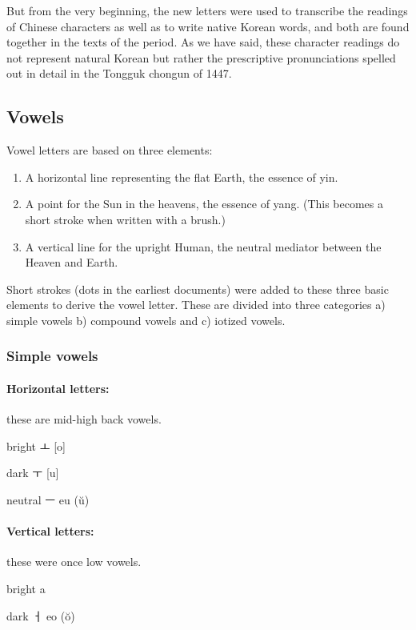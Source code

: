 But from the very beginning, the new letters were used to transcribe
the readings of Chinese characters as well as to write native Korean words,
and both are found together in the texts of the period. As we have said,
these character readings do not represent natural Korean but rather the
prescriptive pronunciations spelled out in detail in the Tongguk chongun
of 1447.

\subsection{Vowels}

Vowel letters are based on three elements:

\begin{enumerate}
\item A horizontal line representing the flat Earth, the essence of yin.

\item A point for the Sun in the heavens, the essence of yang. (This becomes a short stroke when written with a brush.)

\item A vertical line for the upright Human, the neutral mediator between the Heaven and Earth.
\end{enumerate}

Short strokes (dots in the earliest documents) were added to these three basic elements to derive the vowel letter. These are divided into three categories a) simple vowels b) compound vowels and c) iotized vowels. 

\subsubsection{Simple vowels}
\paragraph{Horizontal letters:} these are mid-high back vowels.

bright {\korean ㅗ} [o]

dark {\korean ㅜ} [u]

neutral {\korean ㅡ} eu (ŭ)

\paragraph{Vertical letters:} these were once low vowels.

bright  a

dark {\korean ㅓ} eo (ŏ)

